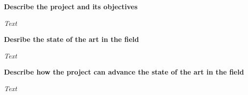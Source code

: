 
\noindent
\textbf{Describe the project and its objectives}

\noindent
\textit{Text}

\noindent
\textbf{Desribe the state of the art in the field}

\noindent
\textit{Text}

\noindent
\textbf{Describe how the project can advance the state of the art in the field}

\noindent
\textit{Text}